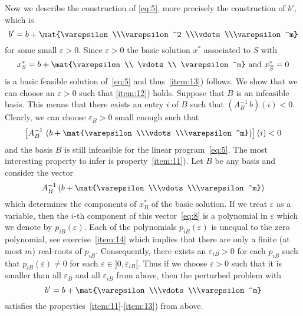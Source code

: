 Now we describe the construction of \eqref{eq:5}, more precisely the
construction of $b'$, which is 
\begin{equation}
  \label{eq:6}
  b' = b+ \mat{\varepsilon\\\varepsilon^2 \\\vdots \\\varepsilon^m}
\end{equation}
for some small $\varepsilon>0$. Since $\varepsilon>0$ the basic solution $x^*$ associated to
$S$ with 
\begin{displaymath}
  x^*_S=b+\mat{\varepsilon \\ \vdots\\ \varepsilon^m}\text{ and }x^*_{\overline{S}}=0 
\end{displaymath}
  is  a basic
feasible solution of~\eqref{eq:5} and thus~\ref{item:13}) follows. We show that we can
choose an $\varepsilon>0$ such that \ref{item:12}) holds. Suppose that $B$ is an
infeasible basis. This means that there exists an entry $i$ of $B$
such that $(A_B^{-1} \, b)(i) < 0$. Clearly, we can choose $\varepsilon_B>0$
small enough such that 
\begin{equation}
  \label{eq:7}
  \left[A_B^{-1}\,\left(b+\mat{\varepsilon\\\vdots\\\varepsilon^m}\right)\right](i)<0
\end{equation}
and the basis $B$ is still infeasible for the linear
program~\eqref{eq:5}. The most interesting property to infer is
property~\ref{item:11}). Let $B$ be any basis and consider the vector
\begin{equation}
  \label{eq:8}
  A_B^{-1} \left(b + \mat{\varepsilon\\\vdots\\\varepsilon^m}\right) 
\end{equation}
which determines the components of $x^*_B$ of the basic solution. If
we treat $\varepsilon$ as a variable, then the $i$-th component of this
vector~\eqref{eq:8} is a polynomial in $\varepsilon$ which we denote by
$p_{iB}(\varepsilon)$. Each of the polynomials $p_{iB}(\varepsilon)$ is unequal to the
zero polynomial,
see exercise~\ref{item:14} which implies that there are only a finite
(at most $m$) real-roots of $p_{iB}$. Consequently, there exists an
$\varepsilon_{iB}>0$ for each $p_{iB}$ such that $p_{iB}(\varepsilon) \neq 0$ for each $\varepsilon
\in ]0, \varepsilon_{iB}[$. 
Thus if we choose $\varepsilon>0$ such that it is smaller than all $\varepsilon_B$ and
all $\varepsilon_{iB}$ from above, then the perturbed problem with 
\begin{displaymath}
  b' = b + \mat{\varepsilon\\\vdots\\\varepsilon^m}
\end{displaymath}
satisfies the properties~\ref{item:11}-\ref{item:13}) from above. 



